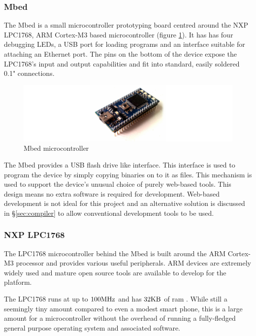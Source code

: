 			\subsubsection{Mbed}
				
				The Mbed is a small microcontroller prototyping board centred around the
				NXP LPC1768, ARM Cortex-M3 based microcontroller (figure
				\ref{fig:mbed}). It has has four debugging LEDs, a USB port for loading
				programs and an interface suitable for attaching an Ethernet port. The
				pins on the bottom of the device expose the LPC1768's input and output
				capabilities and fit into standard, easily soldered 0.1" connections.
				
				\begin{figure}
					\includegraphics[width=1\textwidth]{diagrams/mbed.pdf}
					\caption{Mbed microcontroller}
					\label{fig:mbed}
				\end{figure}
				
				The Mbed provides a USB flash drive like interface. This interface is
				used to program the device by simply copying binaries on to it as files.
				This mechanism is used to support the device's unusual choice of purely
				web-based tools. This design means no extra software is required for
				development. Web-based development is not ideal for this project and an
				alternative solution is discussed in \S\ref{sec:compiler} to allow
				conventional development tools to be used.
			
			\subsubsection{NXP LPC1768}
				
				The LPC1768 microcontroller behind the Mbed is built around the
				ARM Cortex-M3 processor and provides various useful peripherals. ARM
				devices are extremely widely used and mature open source tools are
				available to develop for the platform.
				
				The LPC1768 runs at up to $100\textrm{MHz}$ and has $32\textrm{KB}$ of ram
				\cite{lpc1768}. While still a seemingly tiny amount compared to even a
				modest smart phone, this is a large amount for a microcontroller without
				the overhead of running a fully-fledged general purpose operating system
				and associated software.
				
